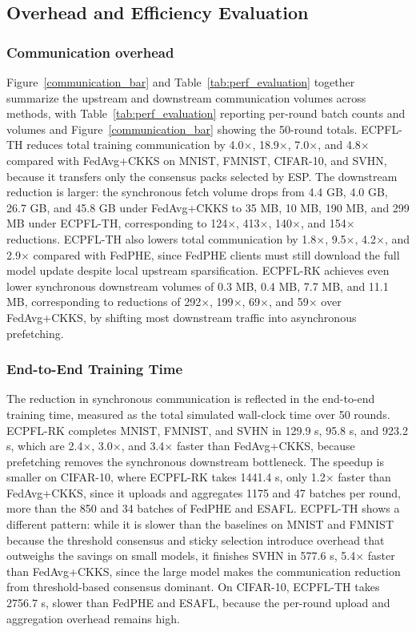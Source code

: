 \subsection{Overhead and Efficiency Evaluation}
\label{subsec:communication}

\subsubsection{Communication overhead}

Figure~\ref{communication_bar} and Table~\ref{tab:perf_evaluation} together summarize the upstream and downstream communication volumes across methods, with Table~\ref{tab:perf_evaluation} reporting per-round batch counts and volumes and Figure~\ref{communication_bar} showing the 50-round totals. ECPFL-TH reduces total training communication by 4.0$\times$, 18.9$\times$, 7.0$\times$, and 4.8$\times$ compared with FedAvg+CKKS on MNIST, FMNIST, CIFAR-10, and SVHN, because it transfers only the consensus packs selected by ESP. The downstream reduction is larger: the synchronous fetch volume drops from 4.4 GB, 4.0 GB, 26.7 GB, and 45.8 GB under FedAvg+CKKS to 35 MB, 10 MB, 190 MB, and 299 MB under ECPFL-TH, corresponding to 124$\times$, 413$\times$, 140$\times$, and 154$\times$ reductions. ECPFL-TH also lowers total communication by 1.8$\times$, 9.5$\times$, 4.2$\times$, and 2.9$\times$ compared with FedPHE, since FedPHE clients must still download the full model update despite local upstream sparsification. ECPFL-RK achieves even lower synchronous downstream volumes of 0.3 MB, 0.4 MB, 7.7 MB, and 11.1 MB, corresponding to reductions of 292$\times$, 199$\times$, 69$\times$, and 59$\times$ over FedAvg+CKKS, by shifting most downstream traffic into asynchronous prefetching.

\subsubsection{End-to-End Training Time}

The reduction in synchronous communication is reflected in the end-to-end training time, measured as the total simulated wall-clock time over 50 rounds. ECPFL-RK completes MNIST, FMNIST, and SVHN in 129.9 s, 95.8 s, and 923.2 s, which are 2.4$\times$, 3.0$\times$, and 3.4$\times$ faster than FedAvg+CKKS, because prefetching removes the synchronous downstream bottleneck. The speedup is smaller on CIFAR-10, where ECPFL-RK takes 1441.4 s, only 1.2$\times$ faster than FedAvg+CKKS, since it uploads and aggregates 1175 and 47 batches per round, more than the 850 and 34 batches of FedPHE and ESAFL. ECPFL-TH shows a different pattern: while it is slower than the baselines on MNIST and FMNIST because the threshold consensus and sticky selection introduce overhead that outweighs the savings on small models, it finishes SVHN in 577.6 s, 5.4$\times$ faster than FedAvg+CKKS, since the large model makes the communication reduction from threshold-based consensus dominant. On CIFAR-10, ECPFL-TH takes 2756.7 s, slower than FedPHE and ESAFL, because the per-round upload and aggregation overhead remains high.
